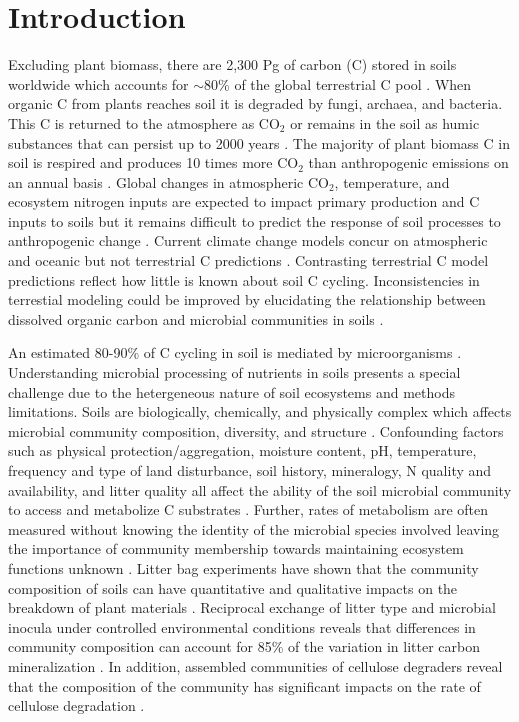\section{Introduction}
Excluding plant biomass, there are 2,300 Pg of carbon (C) stored in soils
worldwide which accounts for $\sim$80\% of the global terrestrial C pool
\citep{Amundson_2001,BATJES_1996}. When organic C from plants reaches soil it
is degraded by fungi, archaea, and bacteria. This C is returned to the
atmosphere as CO$_{2}$ or remains in the soil as humic substances that can
persist up to 2000 years \citep{yanagita1990natural}. The majority of plant
biomass C in soil is respired and produces 10 times more CO$_{2}$ than
anthropogenic emissions on an annual basis \citep{chapin2002principles}.
Global changes in atmospheric CO$_{2}$, temperature, and ecosystem nitrogen
inputs are expected to impact primary production and C inputs to soils
\citep{Groenigen_2006} but it remains difficult to predict the response of soil
processes to anthropogenic change \citep{DAVIDSON_2006}. Current climate change
models concur on atmospheric and oceanic but not terrestrial C predictions
\citep{Friedlingstein_2006}. Contrasting terrestrial C model predictions
reflect how little is known about soil C cycling.  Inconsistencies in terrestial
modeling could be improved by elucidating the relationship between dissolved
organic carbon and microbial communities in soils \citep{Neff_2001}.

An estimated 80-90\% of C cycling in soil is mediated by microorganisms
\citep{ColemanCrossley_1996,Nannipieri_2003}. Understanding microbial
processing of nutrients in soils presents a special challenge due to the
hetergeneous nature of soil ecosystems and methods limitations. Soils are
biologically, chemically, and physically complex which affects microbial
community composition, diversity, and structure \citep{Nannipieri_2003}.
Confounding factors such as physical protection/aggregation, moisture content,
pH, temperature, frequency and type of land disturbance, soil history,
mineralogy, N quality and availability, and litter quality all affect the
ability of the soil microbial community to access and metabolize C substrates
\citep{Sollins_Homann_Caldwell_1996,Kalbitz_2000}. Further, rates of metabolism
are often measured without knowing the identity of the microbial species
involved \citep{ndi_Pietramellara_Renella_2003} leaving the importance of
community membership towards maintaining ecosystem functions unknown
\citep{Allison_2008,ndi_Pietramellara_Renella_2003,Schimel_2012}. Litter bag
experiments have shown that the community composition of soils can have
quantitative and qualitative impacts on the breakdown of plant materials
\citep{Schimel_1995}. Reciprocal exchange of litter type and microbial inocula
under controlled environmental conditions reveals that differences in community
composition can account for 85\% of the variation in litter carbon
mineralization \citep{Strickland_2009}. In addition, assembled communities of
cellulose degraders reveal that the composition of the community has
significant impacts on the rate of cellulose degradation \citep{Wohl_2004}. 

